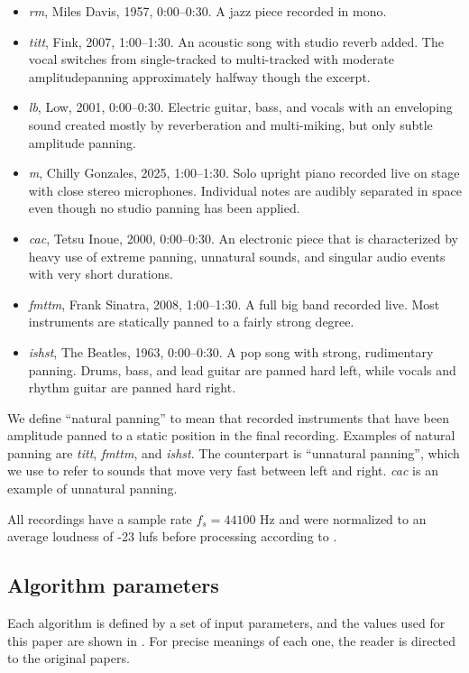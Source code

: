 \documentclass[twoside,a4paper]{article}
\newcommand{\RM}{\textit{\gls{rm}}}
\newcommand{\TITT}{\textit{\gls{titt}}}
\newcommand{\LB}{\textit{\gls{lb}}}
\newcommand{\M}{\textit{\gls{m}}}
\newcommand{\CAC}{\textit{\gls{cac}}}
\newcommand{\FMTTM}{\textit{\gls{fmttm}}}
\newcommand{\ISHST}{\textit{\gls{ishst}}}
\begin{document}
\begin{itemize}
  \item \RM{}, Miles Davis, 1957, 0:00--0:30. A jazz piece recorded in mono.
  \item \TITT{}, Fink, 2007, 1:00--1:30. An acoustic song with studio reverb added. The vocal switches from single-tracked to multi-tracked with moderate amplitude\linebreak panning approximately halfway though the excerpt.
  \item \LB{}, Low, 2001, 0:00--0:30. Electric guitar, bass, and vocals with an enveloping sound created mostly by reverberation and multi-miking, but only subtle amplitude panning.
  \item \M{}, Chilly Gonzales, 2025, 1:00--1:30. Solo upright piano recorded live on stage with close stereo microphones. Individual notes are audibly separated in space even though no studio panning has been applied.
  \item \CAC{}, Tetsu Inoue, 2000, 0:00--0:30. An electronic piece that is characterized by heavy use of extreme panning, unnatural sounds, and singular audio events with very short durations.
  \item \FMTTM{}, Frank Sinatra, 2008, 1:00--1:30. A full big band recorded live. Most instruments are statically panned to a fairly strong degree.
  \item \ISHST{}, The Beatles, 1963, 0:00--0:30. A pop song with strong, rudimentary panning. Drums, bass, and lead guitar are panned hard left, while vocals and rhythm guitar are panned hard right.
\end{itemize}

We define \enquote{natural panning} to mean that recorded instruments that have been amplitude panned to a static position in the final recording. Examples of natural panning are \TITT{}, \FMTTM{}, and \ISHST{}. The counterpart is \enquote{unnatural panning}, which we use to refer to sounds that move very fast between left and right. \CAC{} is an example of unnatural panning. 

All recordings have a sample rate $f_s=44100$ Hz and were normalized to an average loudness of -23 \gls{lufs} before processing according to \cite{ebu-r-128LoudnessNormalisationPermitted2023,itu-r-bs.1770-4AlgorithmsMeasureAudio2015}.

\subsection{Algorithm parameters}
Each algorithm is defined by a set of input parameters, and the values used for this paper are shown in . For precise meanings of each one, the reader is directed to the original papers.
\end{document}
